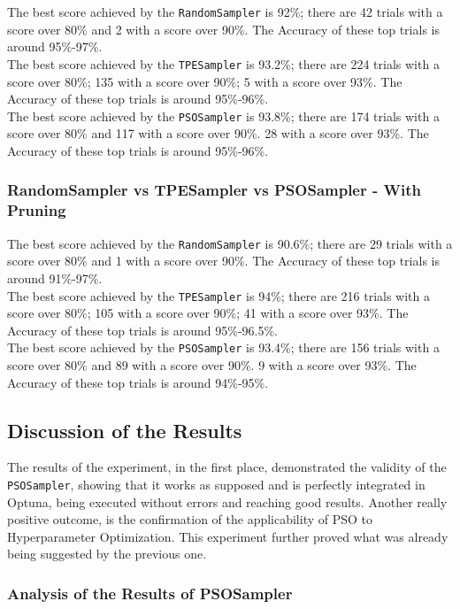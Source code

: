 The best score achieved by the \texttt{RandomSampler} is 92\%; there are 42 trials with a score over 80\% and 2 with a score over 90\%. The Accuracy of these top trials is around 95\%-97\%.
\\[0.3cm]The best score achieved by the \texttt{TPESampler} is 93.2\%; there are 224 trials with a score over 80\%; 135 with a score over 90\%; 5 with a score over 93\%. The Accuracy of these top trials is around 95\%-96\%.
\\[0.3cm]The best score achieved by the \texttt{PSOSampler} is 93.8\%; there are 174 trials with a score over 80\% and 117 with a score over 90\%. 28 with a score over 93\%. The Accuracy of these top trials is around 95\%-96\%.

\subsubsection{RandomSampler  vs  TPESampler  vs  PSOSampler  -  With Pruning}

The best score achieved by the \texttt{RandomSampler} is 90.6\%; there are 29 trials with a score over 80\% and 1 with a score over 90\%. The Accuracy of these top trials is around 91\%-97\%.
\\[0.3cm]The best score achieved by the \texttt{TPESampler} is 94\%; there are 216 trials with a score over 80\%; 105 with a score over 90\%; 41 with a score over 93\%. The Accuracy of these top trials is around 95\%-96.5\%.
\\[0.3cm]The best score achieved by the \texttt{PSOSampler} is 93.4\%; there are 156 trials with a score over 80\% and 89 with a score over 90\%. 9 with a score over 93\%. The Accuracy of these top trials is around 94\%-95\%.

\subsection{Discussion of the Results}

The results of the experiment, in the first place, demonstrated the validity of the \texttt{PSOSampler}, showing that it works as supposed and is perfectly integrated in Optuna, being executed without errors and reaching good results.
Another really positive outcome, is the confirmation of the applicability of PSO to Hyperparameter Optimization. This experiment further proved what was already being suggested by the previous one. 

\subsubsection{Analysis of the Results of PSOSampler}

